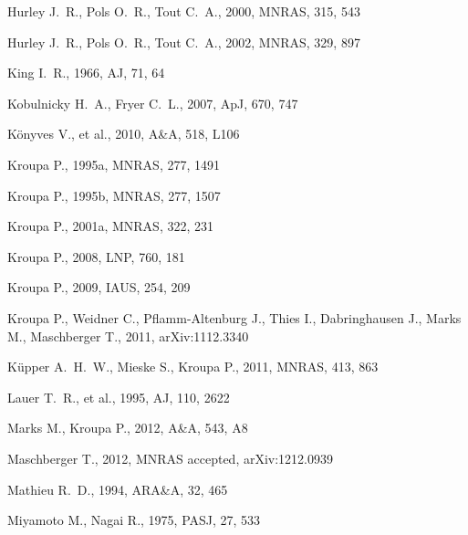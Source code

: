 \documentclass[useAMS,usenatbib]{mn2e}
\begin{document}
\begin{thebibliography}{99}
Hurley J.~R., Pols O.~R., Tout C.~A., 2000, MNRAS, 315, 543

Hurley J.~R., Pols O.~R., Tout C.~A., 2002, MNRAS, 329, 897

King I.~R., 1966, AJ, 71, 64 

Kobulnicky H.~A., Fryer C.~L., 2007, ApJ, 670, 747

K{\"o}nyves V., et al., 2010, A\&A, 518, L106 

Kroupa P., 1995a, MNRAS, 277, 1491

Kroupa P., 1995b, MNRAS, 277, 1507

Kroupa P., 2001a, MNRAS, 322, 231

Kroupa P., 2008, LNP, 760, 181

Kroupa P., 2009, IAUS, 254, 209 

Kroupa P., Weidner C., Pflamm-Altenburg J., Thies I., Dabringhausen J., Marks M., Maschberger T., 2011, arXiv:1112.3340

K\"upper A.~H.~W., Mieske S., Kroupa P., 2011, MNRAS, 413, 863

Lauer T.~R., et al., 1995, AJ, 110, 2622 

Marks M., Kroupa P., 2012, A\&A, 543, A8 

Maschberger T., 2012, MNRAS accepted, arXiv:1212.0939 

Mathieu R.~D., 1994, ARA\&A, 32, 465

Miyamoto M., Nagai R., 1975, PASJ, 27, 533 


\end{thebibliography}
\end{document}
